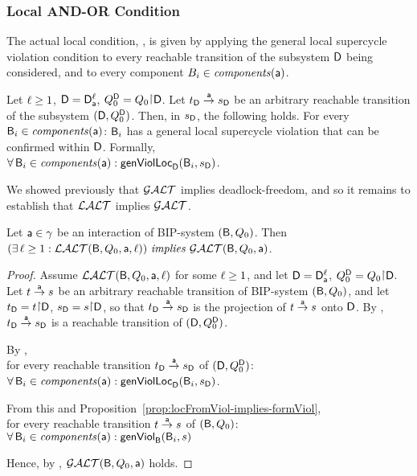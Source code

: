 \subsubsection{Local AND-OR Condition}

The actual local condition, \LAO, is given by applying the general local supercycle violation condition to every reachable transition 
of the subsystem $\dsk{\act}{\l}$ being considered, and to every component $B_i \in \cmps{\act}$.

\begin{definition} \label{def:lao} \label{defn:lao}
Let $\l \ge 1$, $\DS = \dsks{\act}{\l}$, $\QDS = Q_0 \pj \DS$.
Let $\tD \goesto[\act] \sD$ be an arbitrary reachable transition of the subsystem $(\DS, \QDS)$. 
Then, in $\sD$, the following holds. 
For every $\B_i \in \cmps{\act}$:  
$\B_i$ has a general local supercycle violation that can be confirmed within $\dsk{\act}{\l}$.
Formally,\\
\ind  $\fa \B_i \in \cmps{\act} : \locFormViol{\B_i}{\sD}{\act}{\l}$.
\end{definition}
%

%
We showed previously that $\GAO$ implies deadlock-freedom, and so it remains to establish that $\LAO$ implies $\GAO$. 


\begin{lemma}
\label{lem:loc.ANDOR.implies.glob.AND-OR}
\label{lemma:loc.ANDOR.implies.glob.AND-OR}
\label{LAOGAO}
Let $\act \in \gamma$ be an interaction of BIP-system $(\B, Q_0)$. Then\\
\ind $(\ex \l \ge 1: \LAO(\B, Q_0, \act, \l))\ \impliess\ \GAO(\B, Q_0, \act)$. 
\end{lemma}
%
\begin{proof}
Assume $\LAO(\B, Q_0, \act, \l)$ for some $\l \ge 1$, and let $\DS = \dsks{\act}{\l}$, $\QDS = Q_0 \pj \DS$.
%
Let $t \goesto[\act] s$ be an arbitrary reachable transition of BIP-system $(\B, Q_0)$, and let 
$\tD = t \pj \DS$, $\sD = s \pj \DS$, so that 
$\tD \goesto[\act] \sD$ is the projection of $t \goesto[\act] s$ onto $\dsk{\act}{\l}$.
By , $\tD \goesto[\act] \sD$ is a reachable transition of $(\DS, \QDS)$.

\noindent
By ,\\
\ind for every reachable transition $\tD \goesto[\act] \sD$ of $(\DS, \QDS)$:\\
\ind \ind $\fa \B_i \in \cmps{\act} : \locFormViol{\B_i}{\sD}{\act}{\l}$.

\noindent
From this and Proposition~\ref{prop:locFromViol-implies-formViol},\\
\ind for every reachable transition $t \goesto[\act] s$ of  $(\B, Q_0)$:\\ 
\ind \ind $\fa \B_i \in \cmps{\act} : \formViol{\B_i}{s}$

\noindent
Hence, by , $\GAO(\B, Q_0, \act)$ holds.
\end{proof}



